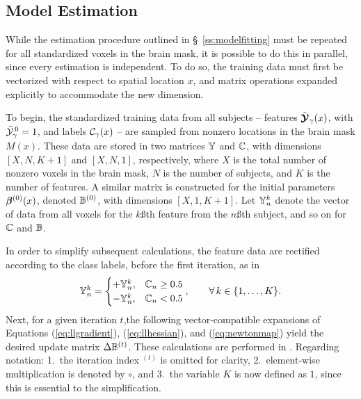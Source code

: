 \subsection{Model Estimation}\label{s:parallelfit}
While the estimation procedure outlined in \S~\ref{ss:modelfitting}
must be repeated for all standardized voxels in the brain mask,
it is possible to do this in parallel, since every estimation is independent.
To do so, the training data must first be vectorized with respect to spatial location $x$,
and matrix operations expanded explicitly to accommodate the new dimension.
\par
To begin, the standardized training data from all subjects
-- features $\tilde{\bm{\mathcal{Y}}}_{\gamma}(x)$, with $\tilde{\mathcal{Y}}_{\gamma}^{\thinspace0}=1$,
and labels $\mathcal{C}_{\gamma}(x)$ --
are sampled from nonzero locations in the brain mask $M(x)$.
These data are stored in two matrices $\mathbb{Y}$ and $\mathbb{C}$,
with dimensions $[X,N,K+1]$ and $[X,N,1]$, respectively, where
$X$ is the total number of nonzero voxels in the brain mask,
$N$ is the number of subjects, and
$K$ is the number of features.
A similar matrix is constructed for the initial parameters $\bm{\beta}^{(0)}(x)$, denoted $\mathbb{B}^{(0)}$,
with dimensions $[X,1,K+1]$.
Let $\mathbb{Y}_n^k$ denote the vector of data
from all voxels for the $k$\ss{th} feature from the $n$\ss{th} subject,
and so on for $\mathbb{C}$ and $\mathbb{B}$.
\par
In order to simplify subsequent calculations,
the feature data are rectified according to the class labels,
before the first iteration, as in
\begin{equation}
  \mathbb{Y}_n^k =
  \begin{cases}
    +\mathbb{Y}_n^k, & \mathbb{C}_n \ge 0.5\\
    -\mathbb{Y}_n^k, & \mathbb{C}_n  <  0.5\\
  \end{cases},\qquad\forall\thinspace k \in \{1,\dots,K\}.
\end{equation}
Next, for a given iteration $t$,the following vector-compatible expansions of Equations
(\ref{eq:llgradient}), (\ref{eq:llhessian}), and (\ref{eq:newtonmap})
yield the desired update matrix $\Delta\mathbb{B}^{(t)}$.
These calculations are performed in .
Regarding notation:
1.\ the iteration index ${}^{(t)}$ is omitted for clarity,
2.\ element-wise multiplication is denoted by $\circ$, and
3.\ the variable $K$ is now defined as $1$, since this is essential to the simplification.
\par
